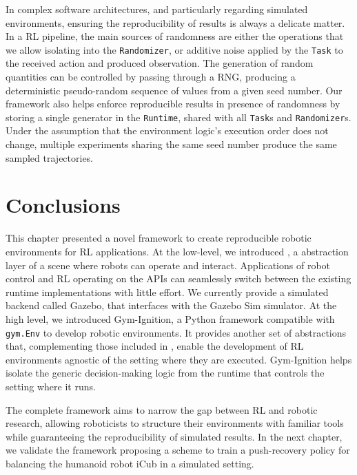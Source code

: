In complex software architectures, and particularly regarding simulated environments, ensuring the reproducibility of results is always a delicate matter.
In a \ac{RL} pipeline, the main sources of randomness are either the operations that we allow isolating into the \verb|Randomizer|, or additive noise applied by the \verb|Task| to the received action and produced observation.
The generation of random quantities can be controlled by passing through a \ac{RNG}, producing a deterministic pseudo-random sequence of values from a given seed number.
Our framework also helps enforce reproducible results in presence of randomness by storing a single generator in the \verb|Runtime|, shared with all \verb|Task|s and \verb|Randomizer|s.
Under the assumption that the environment logic's execution order does not change, multiple experiments sharing the same seed number produce the same sampled trajectories.

\section{Conclusions}

This chapter presented a novel framework to create reproducible robotic environments for \acl{RL} applications.
At the low-level, we introduced \scenario, a \cpp abstraction layer of a scene where robots can operate and interact.
Applications of robot control and \ac{RL} operating on the \scenario \acp{API} can seamlessly switch between the existing runtime implementations with little effort.
We currently provide a simulated backend called \scenario Gazebo, that interfaces with the Gazebo Sim simulator.
At the high level, we introduced Gym-Ignition, a Python framework compatible with \verb|gym.Env| to develop robotic environments.
It provides another set of abstractions that, complementing those included in \scenario, enable the development of \ac{RL} environments agnostic of the setting where they are executed.
Gym-Ignition helps isolate the generic decision-making logic from the runtime that controls the setting where it runs.

The complete framework aims to narrow the gap between \ac{RL} and robotic research, allowing roboticists to structure their environments with familiar tools while guaranteeing the reproducibility of simulated results.
In the next chapter, we validate the framework proposing a scheme to train a push-recovery policy  for balancing the humanoid robot iCub in a simulated setting.
